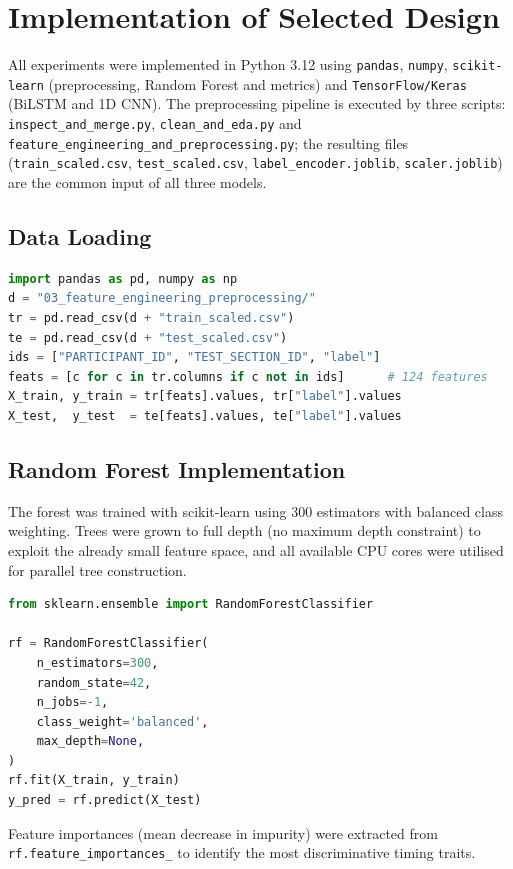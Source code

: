 \section{Implementation of Selected Design}
\label{sec:implementation}

All experiments were implemented in Python 3.12 using \texttt{pandas}, \texttt{numpy}, \texttt{scikit-learn} (preprocessing, Random Forest and metrics) and \texttt{TensorFlow/Keras} (BiLSTM and 1D CNN). The preprocessing pipeline is executed by three scripts: \texttt{inspect\_and\_merge.py}, \texttt{clean\_and\_eda.py} and \texttt{feature\_engineering\_and\_preprocessing.py}; the resulting files (\texttt{train\_scaled.csv}, \texttt{test\_scaled.csv}, \texttt{label\_encoder.joblib}, \texttt{scaler.joblib}) are the common input of all three models.

\subsection{Data Loading}
\begin{lstlisting}[language=Python]
import pandas as pd, numpy as np
d = "03_feature_engineering_preprocessing/"
tr = pd.read_csv(d + "train_scaled.csv")
te = pd.read_csv(d + "test_scaled.csv")
ids = ["PARTICIPANT_ID", "TEST_SECTION_ID", "label"]
feats = [c for c in tr.columns if c not in ids]      # 124 features
X_train, y_train = tr[feats].values, tr["label"].values
X_test,  y_test  = te[feats].values, te["label"].values
\end{lstlisting}

\subsection{Random Forest Implementation}
The forest was trained with scikit-learn using 300 estimators with balanced class weighting. Trees were grown to full depth (no maximum depth constraint) to exploit the already small feature space, and all available CPU cores were utilised for parallel tree construction.
\begin{lstlisting}[language=Python]
from sklearn.ensemble import RandomForestClassifier

rf = RandomForestClassifier(
    n_estimators=300,
    random_state=42,
    n_jobs=-1,
    class_weight='balanced',
    max_depth=None,
)
rf.fit(X_train, y_train)
y_pred = rf.predict(X_test)
\end{lstlisting}
Feature importances (mean decrease in impurity) were extracted from \texttt{rf.feature\_importances\_} to identify the most discriminative timing traits.

